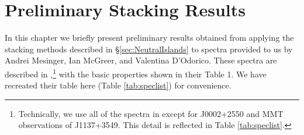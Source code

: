 \ifpdf
    \graphicspath{{preliminary_neutral_islands/figures/PNG/}{example_chapter/figures/PDF/}{preliminary_neutral_islands/figures/}}
\else
    \graphicspath{{preliminary_neutral_islands/figures/EPS/}{preliminary_neutral_islands/figures/}}
\fi


\chapter{Preliminary Stacking Results}\label{sec:Preliminary}

In this chapter we briefly present preliminary results obtained from applying the stacking methods described in \S \ref{sec:NeutralIslands} to spectra provided to us by Andrei Mesinger, Ian McGreer, and Valentina D'Odorico. These spectra are described in \citet{McGreer:2014qwa},\footnote{Technically, we use all of the spectra in \citet{McGreer:2014qwa} except for J0002+2550 and MMT observations of J1137+3549. This detail is reflected in Table \ref{tab:speclist}.} with the basic properties shown in their Table 1. We have recreated their table here (Table \ref{tab:speclist}) for convenience. 


